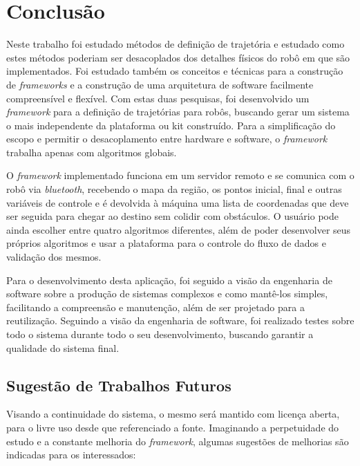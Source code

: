 \chapter[Conclusão]{Conclusão}

Neste trabalho foi estudado métodos de definição de trajetória e estudado como estes métodos poderiam ser desacoplados dos detalhes físicos do robô em que são implementados. Foi estudado também os conceitos e técnicas para a construção de \textit{frameworks} e a construção de uma arquitetura de software facilmente compreensível e flexível. Com estas duas pesquisas, foi desenvolvido um \textit{framework} para a definição de trajetórias para robôs, buscando gerar um sistema o mais independente da plataforma ou kit construído. Para a simplificação do escopo e permitir o desacoplamento entre hardware e software, o \textit{framework} trabalha apenas com algoritmos globais.

O \textit{framework} implementado funciona em um servidor remoto e se comunica com o robô via \textit{bluetooth}, recebendo o mapa da região, os pontos inicial, final e outras variáveis de controle e é devolvida à máquina uma lista de coordenadas que deve ser seguida para chegar ao destino sem colidir com obstáculos. O usuário pode ainda escolher entre quatro algoritmos diferentes, além de poder desenvolver seus próprios algoritmos e usar a plataforma para o controle do fluxo de dados e validação dos mesmos.

Para o desenvolvimento desta aplicação, foi seguido a visão da engenharia de software sobre a produção de sistemas complexos e como mantê-los simples, facilitando a compreensão e manutenção, além de ser projetado para a reutilização. Seguindo a visão da engenharia de software, foi realizado testes sobre todo o sistema durante todo o seu desenvolvimento, buscando garantir a qualidade do sistema final.

\section{Sugestão de Trabalhos Futuros}

Visando a continuidade do sistema, o mesmo será mantido com licença aberta, para o livre uso desde que referenciado a fonte. Imaginando a perpetuidade do estudo e a constante melhoria do \textit{framework}, algumas sugestões de melhorias são indicadas para os interessados:


